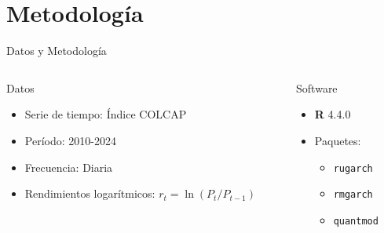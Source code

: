 \section{Metodología}

\begin{frame}{Datos y Metodología}
    \begin{columns}
        \begin{column}{0.6\textwidth}
            \begin{block}{Datos}
                \begin{itemize}
                    \item Serie de tiempo: Índice COLCAP
                    \item Período: 2010-2024
                    \item Frecuencia: Diaria
                    \item Rendimientos logarítmicos: $r_t = \ln(P_t/P_{t-1})$
                \end{itemize}
            \end{block}
        \end{column}
        
        \begin{column}{0.4\textwidth}
            \begin{block}{Software}
                \begin{itemize}
                    \item \textbf{R} 4.4.0
                    \item Paquetes:
                    \begin{itemize}
                        \item \texttt{rugarch}
                        \item \texttt{rmgarch}
                        \item \texttt{quantmod}
                    \end{itemize}
                \end{itemize}
            \end{block}
        \end{column}
    \end{columns}
\end{frame}

